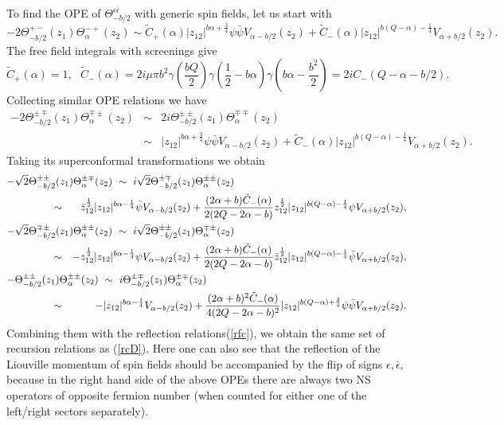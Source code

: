 \documentclass[a4paper,12pt]{article}
\newcommand{\tfrac}[2]{{\textstyle\frac{#1}{#2}}}
\newcommand{\ep}{{\epsilon}}
\newcommand{\bep}{{\bar{\epsilon}}}
\begin{document}
   To find the OPE of $\Theta_{-b/2}^{\ep\bep}$ with
 generic spin fields, let us start with
\begin{equation}
 -2\Theta_{-b/2}^{+-}(z_1)\Theta_\alpha^{-+}(z_2)
 \sim \tilde{C}_+(\alpha)|z_{12}|^{b\alpha+\frac{3}{4}}
      \psi\bar{\psi}V_{\alpha-b/2}(z_2)
     +\tilde{C}_-(\alpha)|z_{12}|^{b(Q-\alpha)-\frac{1}{4}}
      V_{\alpha+b/2}(z_2).
\end{equation}
 The free field integrals with screenings give
\begin{equation}
 \tilde{C}_+(\alpha)=1,~~~
 \tilde{C}_-(\alpha)=2i\mu\pi b^2\gamma(\tfrac{bQ}{2})
  \gamma(\tfrac{1}{2}-b\alpha)\gamma(b\alpha-\tfrac{b^2}{2})
  = 2iC_-(Q-\alpha-b/2).
\end{equation}
 Collecting similar OPE relations we have
\begin{eqnarray}
 -2\Theta_{-b/2}^{\pm\mp}(z_1)\Theta_\alpha^{\mp\pm}(z_2)
 &\sim&
 2i\Theta_{-b/2}^{\pm\pm}(z_1)\Theta_\alpha^{\mp\mp}(z_2)\nonumber \\
 &\sim&
   |z_{12}|^{b\alpha+\frac{3}{4}}\psi\bar{\psi}V_{\alpha-b/2}(z_2)
 +\tilde{C}_-(\alpha)|z_{12}|^{b(Q-\alpha)-\frac{1}{4}}V_{\alpha+b/2}(z_2).
\label{SxS}
\end{eqnarray}
 Taking its superconformal transformations we obtain
\begin{eqnarray}
\lefteqn{
 -\sqrt{2}\Theta_{-b/2}^{\pm\pm}(z_1)\Theta_\alpha^{\pm\mp}(z_2)
 ~\sim~
 i\sqrt{2}\Theta_{-b/2}^{\pm\mp}(z_1)\Theta_\alpha^{\pm\pm}(z_2)
} \hskip15mm \nonumber \\
 &\sim&
   \bar{z}_{12}^{\frac{1}{2}}|z_{12}|^{b\alpha-\frac{1}{4}}
  \bar{\psi}V_{\alpha-b/2}(z_2)
 +\frac{(2\alpha+b)\tilde{C}_-(\alpha)}{2(2Q-2\alpha-b)}
   z_{12}^{\frac{1}{2}}|z_{12}|^{b(Q-\alpha)-\frac{1}{4}}
  \psi V_{\alpha+b/2}(z_2),
 \nonumber \\
\lefteqn{
 -\sqrt{2}\Theta_{-b/2}^{\mp\pm}(z_1)\Theta_\alpha^{\pm\pm}(z_2)
 ~\sim~
 i\sqrt{2}\Theta_{-b/2}^{\pm\pm}(z_1)\Theta_\alpha^{\mp\pm}(z_2)
} \hskip15mm \nonumber \\
 &\sim&
 - z_{12}^{\frac{1}{2}}|z_{12}|^{b\alpha-\frac{1}{4}}
  \psi V_{\alpha-b/2}(z_2)
 +\frac{(2\alpha+b)\tilde{C}_-(\alpha)}{2(2Q-2\alpha-b)}
   \bar{z}_{12}^{\frac{1}{2}}|z_{12}|^{b(Q-\alpha)-\frac{1}{4}}
  \bar{\psi} V_{\alpha+b/2}(z_2),
 \nonumber \\
\lefteqn{
 -\Theta_{-b/2}^{\pm\pm}(z_1)\Theta_\alpha^{\pm\pm}(z_2)
 ~\sim~
 i\Theta_{-b/2}^{\pm\mp}(z_1)\Theta_\alpha^{\pm\mp}(z_2)
} \hskip15mm \nonumber \\
 &\sim&
 - |z_{12}|^{b\alpha-\frac{1}{4}}V_{\alpha-b/2}(z_2)
 +\frac{(2\alpha+b)^2\tilde{C}_-(\alpha)}{4(2Q-2\alpha-b)^2}
   |z_{12}|^{b(Q-\alpha)+\frac{3}{4}}
  \psi\bar{\psi} V_{\alpha+b/2}(z_2).
\end{eqnarray}
 Combining them with the reflection relations(\ref{rfc}), we obtain
 the same set of recursion relations as (\ref{rcD}).
 Here one can also see that the reflection of the Liouville momentum
 of spin fields should be accompanied by the flip of signs $\ep,\bep$,
 because in the right hand side of the above OPEs there are
 always two NS operators of opposite fermion number
 (when counted for either one of the left/right sectors separately).
\end{document}
